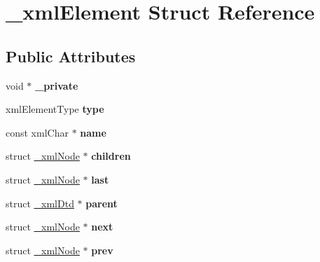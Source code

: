 \hypertarget{struct__xml_element}{}\section{\+\_\+xml\+Element Struct Reference}
\label{struct__xml_element}
\subsection*{Public Attributes}
\begin{DoxyCompactItemize}
\item 
\mbox{\label{struct__xml_element_a1771412a687f3fa1ab248c62ed486d0b}} 
void $\ast$ {\bfseries \+\_\+private}
\item 
\mbox{\label{struct__xml_element_ac73d23a5babfe6a4c48154cece65cecb}} 
xml\+Element\+Type {\bfseries type}
\item 
\mbox{\label{struct__xml_element_a2aeca065453944e7eeedf8c7622660b9}} 
const xml\+Char $\ast$ {\bfseries name}
\item 
\mbox{\label{struct__xml_element_a9a61f0ef96d83c54c78fc8c44a3f17df}} 
struct \mbox{\hyperlink{struct__xml_node}{\+\_\+xml\+Node}} $\ast$ {\bfseries children}
\item 
\mbox{\label{struct__xml_element_abd8e4a7d4c80a883edfd5a694e029b8c}} 
struct \mbox{\hyperlink{struct__xml_node}{\+\_\+xml\+Node}} $\ast$ {\bfseries last}
\item 
\mbox{\label{struct__xml_element_a6e82cf8a8a00afdf1facbe0d95f8c691}} 
struct \mbox{\hyperlink{struct__xml_dtd}{\+\_\+xml\+Dtd}} $\ast$ {\bfseries parent}
\item 
\mbox{\label{struct__xml_element_ae8e3606454fe2af6d20c073a1d3045ab}} 
struct \mbox{\hyperlink{struct__xml_node}{\+\_\+xml\+Node}} $\ast$ {\bfseries next}
\item 
\mbox{\label{struct__xml_element_a6de172fb1891a78067d27b8680d493a0}} 
struct \mbox{\hyperlink{struct__xml_node}{\+\_\+xml\+Node}} $\ast$ {\bfseries prev}
\item 

\end{DoxyCompactItemize}
